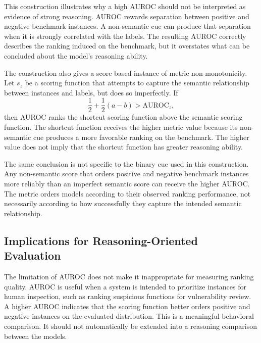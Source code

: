 \documentclass[acmsmall,screen,review,anonymous]{acmart}
\begin{document}
This construction illustrates why a high AUROC should not be interpreted as
evidence of strong reasoning. AUROC rewards separation between positive and
negative benchmark instances. A non-semantic cue can produce that separation
when it is strongly correlated with the labels. The resulting AUROC correctly
describes the ranking induced on the benchmark, but it overstates what can be
concluded about the model's reasoning ability.

The construction also gives a score-based instance of metric
non-monotonicity. Let \(s_z\) be a scoring function that attempts to capture
the semantic relationship between instances and labels, but does so
imperfectly. If
\[
\frac{1}{2}+\frac{1}{2}(a-b)
>
\mathrm{AUROC}_z,
\]
then AUROC ranks the shortcut scoring function above the semantic scoring
function. The shortcut function receives the higher metric value because its
non-semantic cue produces a more favorable ranking on the benchmark. The
higher value does not imply that the shortcut function has greater reasoning
ability.

The same conclusion is not specific to the binary cue used in this
construction. Any non-semantic score that orders positive and negative
benchmark instances more reliably than an imperfect semantic score can
receive the higher AUROC. The metric orders models according to their
observed ranking performance, not necessarily according to how successfully
they capture the intended semantic relationship.


\subsection{Implications for Reasoning-Oriented Evaluation}

The limitation of AUROC does not make it inappropriate for measuring ranking
quality. AUROC is useful when a system is intended to prioritize instances
for human inspection, such as ranking suspicious functions for vulnerability
review. A higher AUROC indicates that the scoring function better orders
positive and negative instances on the evaluated distribution. This is a
meaningful behavioral comparison. It should not automatically be extended
into a reasoning comparison between the models.
\end{document}
